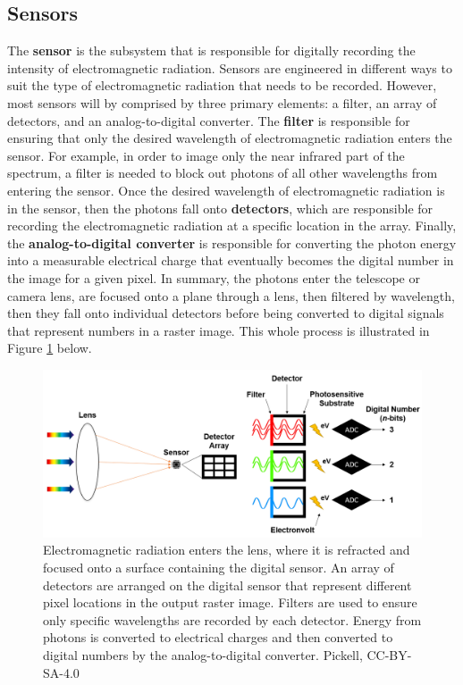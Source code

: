 \documentclass[
]{book}
\begin{document}
\hypertarget{sensors}{%
\subsection{Sensors}\label{sensors}}

The \textbf{sensor} is the subsystem that is responsible for digitally recording the intensity of electromagnetic radiation. Sensors are engineered in different ways to suit the type of electromagnetic radiation that needs to be recorded. However, most sensors will by comprised by three primary elements: a filter, an array of detectors, and an analog-to-digital converter. The \textbf{filter} is responsible for ensuring that only the desired wavelength of electromagnetic radiation enters the sensor. For example, in order to image only the near infrared part of the spectrum, a filter is needed to block out photons of all other wavelengths from entering the sensor. Once the desired wavelength of electromagnetic radiation is in the sensor, then the photons fall onto \textbf{detectors}, which are responsible for recording the electromagnetic radiation at a specific location in the array. Finally, the \textbf{analog-to-digital converter} is responsible for converting the photon energy into a measurable electrical charge that eventually becomes the digital number in the image for a given pixel. In summary, the photons enter the telescope or camera lens, are focused onto a plane through a lens, then filtered by wavelength, then they fall onto individual detectors before being converted to digital signals that represent numbers in a raster image. This whole process is illustrated in Figure \ref{fig:12-lens-sensor-filter-detector-ADC} below.

\begin{figure}
\includegraphics[width=0.9\linewidth]{images/12-lens-sensor-filter-detector-ADC} \caption{Electromagnetic radiation enters the lens, where it is refracted and focused onto a surface containing the digital sensor. An array of detectors are arranged on the digital sensor that represent different pixel locations in the output raster image. Filters are used to ensure only specific wavelengths are recorded by each detector. Energy from photons is converted to electrical charges and then converted to digital numbers by the analog-to-digital converter. Pickell, CC-BY-SA-4.0}\label{fig:12-lens-sensor-filter-detector-ADC}
\end{figure}
\end{document}
